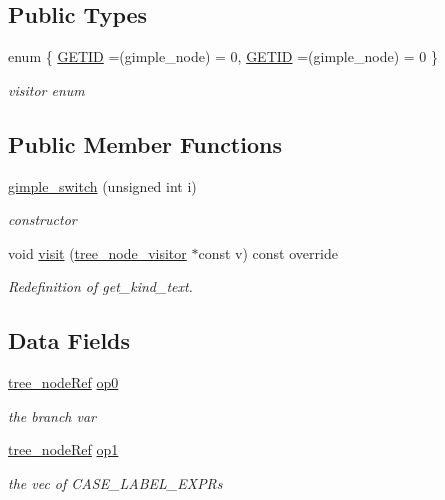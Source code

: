 \subsection*{Public Types}
\begin{DoxyCompactItemize}
\item 
enum \{ \hyperlink{structgimple__switch_afaff8b796085b8db2df523a19ff7f78fa3d59fde1ff5f424fe2cd0e29ffa149ce}{G\+E\+T\+ID} =(gimple\+\_\+node) = 0, 
\hyperlink{structgimple__switch_afaff8b796085b8db2df523a19ff7f78fa3d59fde1ff5f424fe2cd0e29ffa149ce}{G\+E\+T\+ID} =(gimple\+\_\+node) = 0
 \}\begin{DoxyCompactList}\small\item\em visitor enum \end{DoxyCompactList}
\end{DoxyCompactItemize}
\subsection*{Public Member Functions}
\begin{DoxyCompactItemize}
\item 
\hyperlink{structgimple__switch_a6ba1140d8a485d211bacde46db9898b7}{gimple\+\_\+switch} (unsigned int i)
\begin{DoxyCompactList}\small\item\em constructor \end{DoxyCompactList}\item 
void \hyperlink{structgimple__switch_a2fc71fef3c7d9d08e116ca7dba93d0e2}{visit} (\hyperlink{classtree__node__visitor}{tree\+\_\+node\+\_\+visitor} $\ast$const v) const override
\begin{DoxyCompactList}\small\item\em Redefinition of get\+\_\+kind\+\_\+text. \end{DoxyCompactList}\end{DoxyCompactItemize}
\subsection*{Data Fields}
\begin{DoxyCompactItemize}
\item 
\hyperlink{tree__node_8hpp_a6ee377554d1c4871ad66a337eaa67fd5}{tree\+\_\+node\+Ref} \hyperlink{structgimple__switch_a6f8278355156c84217fe69a0a639bfbb}{op0}
\begin{DoxyCompactList}\small\item\em the branch var \end{DoxyCompactList}\item 
\hyperlink{tree__node_8hpp_a6ee377554d1c4871ad66a337eaa67fd5}{tree\+\_\+node\+Ref} \hyperlink{structgimple__switch_a92df1337f0d2f9ea9210dc688b37605f}{op1}
\begin{DoxyCompactList}\small\item\em the vec of C\+A\+S\+E\+\_\+\+L\+A\+B\+E\+L\+\_\+\+E\+X\+P\+Rs \end{DoxyCompactList}\end{DoxyCompactItemize}
